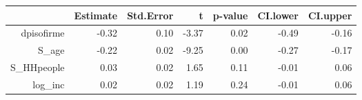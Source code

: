 \begin{table}[ht]
\centering
\begin{tabular}{rrrrrrr}
  \hline
 & Estimate & Std.Error & t & p-value & CI.lower & CI.upper \\ 
  \hline
dpisofirme & -0.32 & 0.10 & -3.37 & 0.02 & -0.49 & -0.16 \\ 
  S\_age & -0.22 & 0.02 & -9.25 & 0.00 & -0.27 & -0.17 \\ 
  S\_HHpeople & 0.03 & 0.02 & 1.65 & 0.11 & -0.01 & 0.06 \\ 
  log\_inc & 0.02 & 0.02 & 1.19 & 0.24 & -0.01 & 0.06 \\ 
   \hline
\end{tabular}
\end{table}
